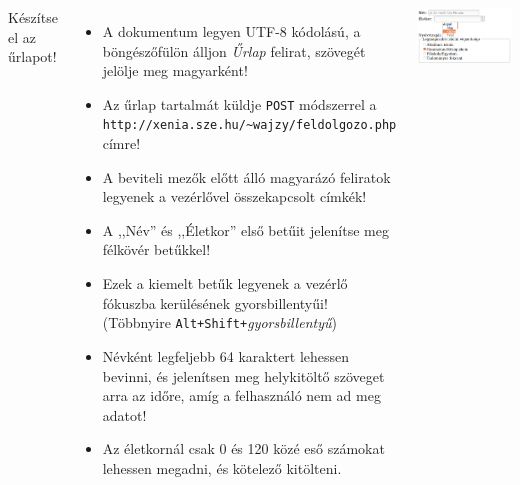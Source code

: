 \begin{frame}
  \begin{columns}[c]
      Készítse el az űrlapot!
      \begin{itemize}
        \scriptsize
        \item A dokumentum legyen UTF-8 kódolású, a böngészőfülön álljon \emph{Űrlap} felirat, szövegét jelölje meg magyarként!
        \item Az űrlap tartalmát küldje \texttt{POST} módszerrel a \texttt{http://xenia.sze.hu/\textasciitilde wajzy/feldolgozo.php} címre!
        \item A beviteli mezők előtt álló magyarázó feliratok legyenek a vezérlővel összekapcsolt címkék!
        \item A ,,Név'' és ,,Életkor'' első betűit jelenítse meg félkövér betűkkel!
        \item Ezek a kiemelt betűk legyenek a vezérlő fókuszba kerülésének gyorsbillentyűi! (Többnyire \texttt{Alt+Shift+}\emph{gyorsbillentyű})
        \item Névként legfeljebb 64 karaktert lehessen bevinni, és jelenítsen meg helykitöltő szöveget arra az időre, amíg a felhasználó nem ad meg adatot!
        \item Az életkornál csak 0 és 120 közé eső számokat lehessen megadni, és kötelező kitölteni.
      \end{itemize}
      \begin{exampleblock}{}
        \includegraphics[width=\textwidth]{urlap-1.png}
      \end{exampleblock}
  \end{columns}
\end{frame}

